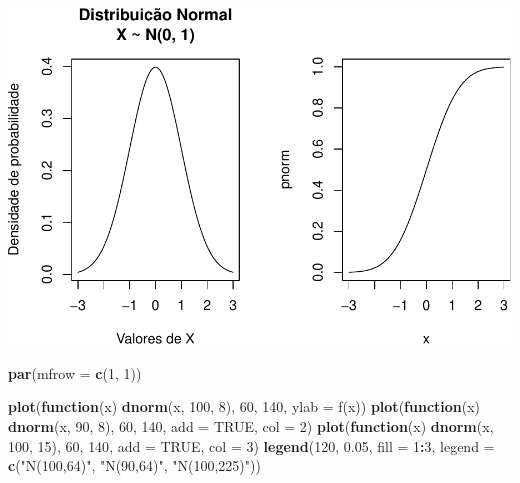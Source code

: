 \documentclass[
]{book}
\newenvironment{Shaded}{\begin{snugshade}}{\end{snugshade}}
\newcommand{\AttributeTok}[1]{\textcolor[rgb]{0.13,0.29,0.53}{#1}}
\newcommand{\ConstantTok}[1]{\textcolor[rgb]{0.56,0.35,0.01}{#1}}
\newcommand{\ControlFlowTok}[1]{\textcolor[rgb]{0.13,0.29,0.53}{\textbf{#1}}}
\newcommand{\DecValTok}[1]{\textcolor[rgb]{0.00,0.00,0.81}{#1}}
\newcommand{\FloatTok}[1]{\textcolor[rgb]{0.00,0.00,0.81}{#1}}
\newcommand{\FunctionTok}[1]{\textcolor[rgb]{0.13,0.29,0.53}{\textbf{#1}}}
\newcommand{\NormalTok}[1]{#1}
\newcommand{\SpecialCharTok}[1]{\textcolor[rgb]{0.81,0.36,0.00}{\textbf{#1}}}
\newcommand{\StringTok}[1]{\textcolor[rgb]{0.31,0.60,0.02}{#1}}
\begin{document}
\includegraphics{introR_files/figure-latex/unnamed-chunk-274-1.pdf}

\begin{Shaded}
\begin{Highlighting}[]
\FunctionTok{par}\NormalTok{(}\AttributeTok{mfrow =} \FunctionTok{c}\NormalTok{(}\DecValTok{1}\NormalTok{, }\DecValTok{1}\NormalTok{))}
\end{Highlighting}
\end{Shaded}

\begin{Shaded}
\begin{Highlighting}[]
\FunctionTok{plot}\NormalTok{(}\ControlFlowTok{function}\NormalTok{(x) }\FunctionTok{dnorm}\NormalTok{(x, }\DecValTok{100}\NormalTok{, }\DecValTok{8}\NormalTok{), }\DecValTok{60}\NormalTok{, }\DecValTok{140}\NormalTok{, }\AttributeTok{ylab =} \StringTok{\textquotesingle{}f(x)\textquotesingle{}}\NormalTok{)}
\FunctionTok{plot}\NormalTok{(}\ControlFlowTok{function}\NormalTok{(x) }\FunctionTok{dnorm}\NormalTok{(x, }\DecValTok{90}\NormalTok{, }\DecValTok{8}\NormalTok{), }\DecValTok{60}\NormalTok{, }\DecValTok{140}\NormalTok{, }\AttributeTok{add =} \ConstantTok{TRUE}\NormalTok{, }\AttributeTok{col =} \DecValTok{2}\NormalTok{)}
\FunctionTok{plot}\NormalTok{(}\ControlFlowTok{function}\NormalTok{(x) }\FunctionTok{dnorm}\NormalTok{(x, }\DecValTok{100}\NormalTok{, }\DecValTok{15}\NormalTok{), }\DecValTok{60}\NormalTok{, }\DecValTok{140}\NormalTok{, }\AttributeTok{add =} \ConstantTok{TRUE}\NormalTok{, }\AttributeTok{col =} \DecValTok{3}\NormalTok{)}
\FunctionTok{legend}\NormalTok{(}\DecValTok{120}\NormalTok{, }\FloatTok{0.05}\NormalTok{, }\AttributeTok{fill =} \DecValTok{1}\SpecialCharTok{:}\DecValTok{3}\NormalTok{,}
       \AttributeTok{legend =} \FunctionTok{c}\NormalTok{(}\StringTok{"N(100,64)"}\NormalTok{, }\StringTok{"N(90,64)"}\NormalTok{, }\StringTok{"N(100,225)"}\NormalTok{))}
\end{Highlighting}
\end{Shaded}
\end{document}
